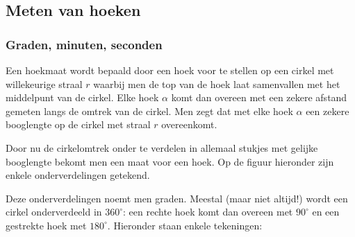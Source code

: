 \subsection{Meten van hoeken}


\subsubsection{Graden, minuten, seconden}

Een hoekmaat wordt bepaald door een hoek voor te stellen op een cirkel met willekeurige straal $r$ waarbij men de top van de hoek laat samenvallen met het middelpunt van de cirkel. Elke hoek $\alpha$ komt dan overeen met een zekere afstand gemeten langs de omtrek van de cirkel. Men zegt dat met elke hoek $\alpha$ een zekere booglengte op de cirkel met straal $r$ overeenkomt.



Door nu de cirkelomtrek onder te verdelen in allemaal stukjes met gelijke booglengte bekomt men een maat voor een hoek. Op de figuur hieronder zijn enkele onderverdelingen getekend.



Deze onderverdelingen noemt men graden. Meestal (maar niet altijd!) wordt een cirkel onderverdeeld in $360^\circ$: een rechte hoek komt dan overeen met $90^\circ$ en een gestrekte hoek met $180^\circ$. Hieronder staan enkele tekeningen:

